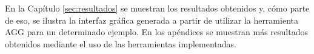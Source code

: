 	En la Capítulo \ref{sec:resultados} se muestran los resultados obtenidos y, cómo parte de eso, se ilustra la interfaz gráfica generada a partir de utilizar la herramienta AGG para un determinado ejemplo. En los apéndices se muestran más resultados obtenidos mediante el uso de las herramientas implementadas.

	

	
